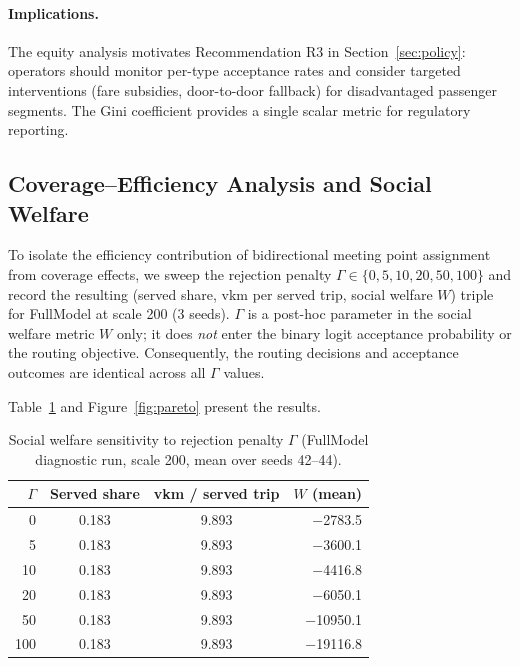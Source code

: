 \paragraph{Implications.}
The equity analysis motivates Recommendation R3 in Section~\ref{sec:policy}:
operators should monitor per-type acceptance rates and consider targeted
interventions (fare subsidies, door-to-door fallback) for disadvantaged
passenger segments. The Gini coefficient provides a single scalar metric
for regulatory reporting.

\subsection{Coverage--Efficiency Analysis and Social Welfare}
\label{sec:pareto}

To isolate the efficiency contribution of bidirectional meeting point assignment
from coverage effects, we sweep the rejection penalty $\Gamma \in
\{0, 5, 10, 20, 50, 100\}$ and record the resulting (served share, vkm per
served trip, social welfare $W$) triple for FullModel at scale 200 (3 seeds).
$\Gamma$ is a post-hoc parameter in the social welfare metric $W$ only; it does
\emph{not} enter the binary logit acceptance probability or the routing
objective. Consequently, the routing decisions and acceptance outcomes are
identical across all $\Gamma$ values.

Table~\ref{tab:pareto} and Figure~\ref{fig:pareto} present the results.

\begin{table}[h]
\centering
\caption{Social welfare sensitivity to rejection penalty $\Gamma$
(FullModel diagnostic run, scale 200, mean over seeds 42--44).}
\label{tab:pareto}
\begin{tabular}{rccr}
\toprule
$\Gamma$ & Served share & vkm / served trip & $W$ (mean) \\
\midrule
0   & 0.183 & 9.893 & $-$2783.5 \\
5   & 0.183 & 9.893 & $-$3600.1 \\
10  & 0.183 & 9.893 & $-$4416.8 \\
20  & 0.183 & 9.893 & $-$6050.1 \\
50  & 0.183 & 9.893 & $-$10950.1 \\
100 & 0.183 & 9.893 & $-$19116.8 \\
\bottomrule
\end{tabular}
\end{table}

